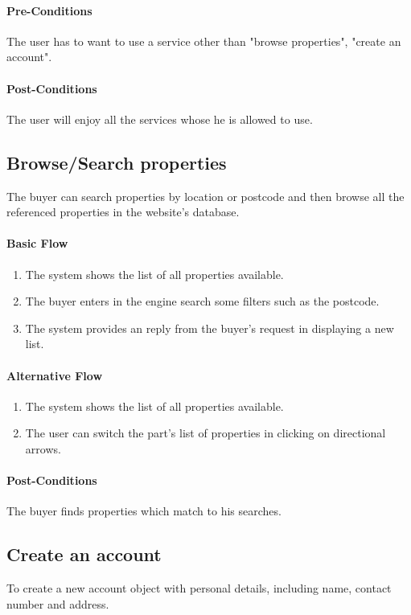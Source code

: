 \documentclass[a4paper,12pt]{article}
\begin{document}
\paragraph{Pre-Conditions}
The user has to want to use a service other than "browse properties", "create an account".
\paragraph{Post-Conditions}
The user will enjoy all the services whose he is allowed to use.

\subsection{Browse/Search properties}
The buyer can search properties by location or postcode and then browse all the referenced properties in the website's database.
\paragraph{Basic Flow}
\begin{enumerate}
\item The system shows the list of all properties available.
\item The buyer enters in the engine search some filters such as the postcode.
\item The system provides an reply from the buyer's request in displaying a new list.
\end{enumerate}
\paragraph{Alternative Flow}
\begin{enumerate}
\item The system shows the list of all properties available.
\item The user can switch the part's list of properties in clicking on directional arrows.
\end{enumerate}
\paragraph{Post-Conditions}
The buyer finds properties which match to his searches.

\subsection{Create an account}
To create a new account object with personal details, including name, contact number and address.
\end{document}

